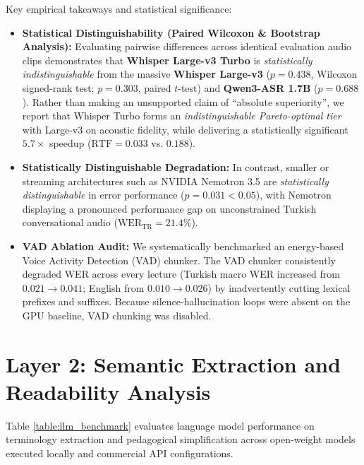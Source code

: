 \documentclass[a4paper,12pt]{report}
\begin{document}
Key empirical takeaways and statistical significance:
\begin{itemize}
    \item \textbf{Statistical Distinguishability (Paired Wilcoxon \& Bootstrap Analysis):} Evaluating pairwise differences across identical evaluation audio clips demonstrates that \textbf{Whisper Large-v3 Turbo} is \emph{statistically indistinguishable} from the massive \textbf{Whisper Large-v3} ($p = 0.438$, Wilcoxon signed-rank test; $p = 0.303$, paired $t$-test) and \textbf{Qwen3-ASR 1.7B} ($p = 0.688$). Rather than making an unsupported claim of ``absolute superiority'', we report that Whisper Turbo forms an \emph{indistinguishable Pareto-optimal tier} with Large-v3 on acoustic fidelity, while delivering a statistically significant $5.7\times$ speedup ($\text{RTF} = 0.033$ vs. $0.188$).
    \item \textbf{Statistically Distinguishable Degradation:} In contrast, smaller or streaming architectures such as NVIDIA Nemotron 3.5 are \emph{statistically distinguishable} in error performance ($p = 0.031 < 0.05$), with Nemotron displaying a pronounced performance gap on unconstrained Turkish conversational audio ($\text{WER}_{\text{TR}} = 21.4\%$).
    \item \textbf{VAD Ablation Audit:} We systematically benchmarked an energy-based Voice Activity Detection (VAD) chunker. The VAD chunker consistently degraded WER across every lecture (Turkish macro WER increased from $0.021 \to 0.041$; English from $0.010 \to 0.026$) by inadvertently cutting lexical prefixes and suffixes. Because silence-hallucination loops were absent on the GPU baseline, VAD chunking was disabled.
\end{itemize}

\section{Layer 2: Semantic Extraction and Readability Analysis}
Table \ref{table:llm_benchmark} evaluates language model performance on terminology extraction and pedagogical simplification across open-weight models executed locally and commercial API configurations.
\end{document}
